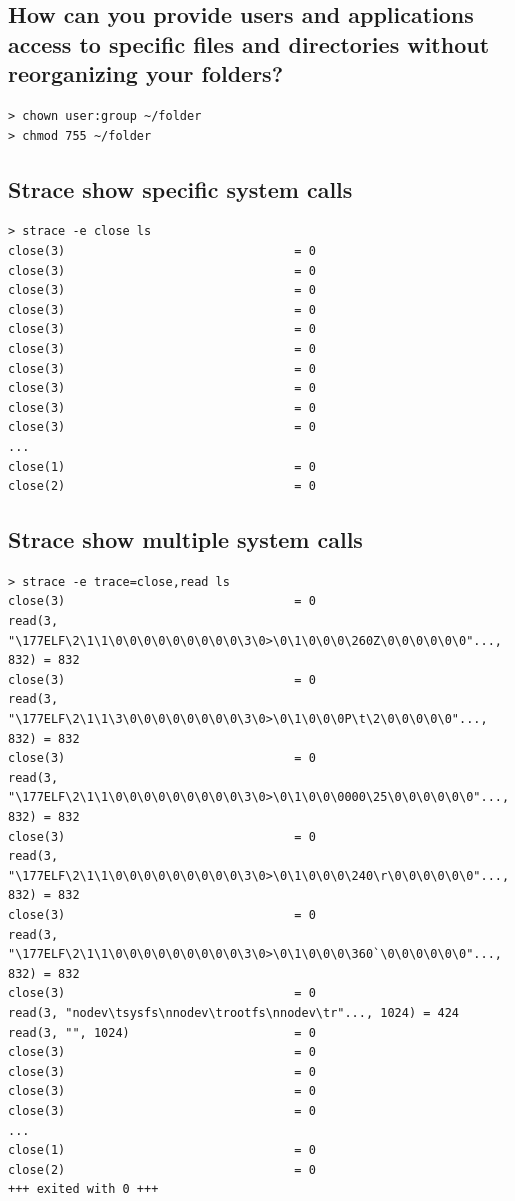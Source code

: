 \documentclass[10pt]{article}
\begin{document}
\subsection{How can you provide users and applications access to specific files and directories without reorganizing your folders?}
\begin{verbatim}
> chown user:group ~/folder
> chmod 755 ~/folder
\end{verbatim}

\subsection{Strace show specific system calls}
\begin{verbatim}
> strace -e close ls
close(3)                                = 0
close(3)                                = 0
close(3)                                = 0
close(3)                                = 0
close(3)                                = 0
close(3)                                = 0
close(3)                                = 0
close(3)                                = 0
close(3)                                = 0
close(3)                                = 0
...
close(1)                                = 0
close(2)                                = 0
\end{verbatim}

\subsection{Strace show multiple system calls}
\begin{verbatim}
> strace -e trace=close,read ls
close(3)                                = 0
read(3, "\177ELF\2\1\1\0\0\0\0\0\0\0\0\0\3\0>\0\1\0\0\0\260Z\0\0\0\0\0\0"..., 832) = 832
close(3)                                = 0
read(3, "\177ELF\2\1\1\3\0\0\0\0\0\0\0\0\3\0>\0\1\0\0\0P\t\2\0\0\0\0\0"..., 832) = 832
close(3)                                = 0
read(3, "\177ELF\2\1\1\0\0\0\0\0\0\0\0\0\3\0>\0\1\0\0\0000\25\0\0\0\0\0\0"..., 832) = 832
close(3)                                = 0
read(3, "\177ELF\2\1\1\0\0\0\0\0\0\0\0\0\3\0>\0\1\0\0\0\240\r\0\0\0\0\0\0"..., 832) = 832
close(3)                                = 0
read(3, "\177ELF\2\1\1\0\0\0\0\0\0\0\0\0\3\0>\0\1\0\0\0\360`\0\0\0\0\0\0"..., 832) = 832
close(3)                                = 0
read(3, "nodev\tsysfs\nnodev\trootfs\nnodev\tr"..., 1024) = 424
read(3, "", 1024)                       = 0
close(3)                                = 0
close(3)                                = 0
close(3)                                = 0
close(3)                                = 0
...
close(1)                                = 0
close(2)                                = 0
+++ exited with 0 +++
\end{verbatim}
\end{document}
